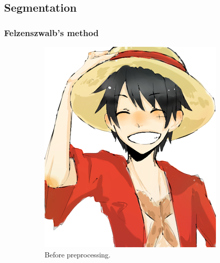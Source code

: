 \subsection{Segmentation}
\subsubsection{Felzenszwalb's method}
\begin{figure}[htb!]
\centering
\begin{subfigure}{.3\textwidth}
\includegraphics[width=\textwidth]{images/rufy_d.png}
\caption{Before preprocessing.}
\end{subfigure}
\begin{subfigure}{.3\textwidth}

\end{subfigure}
\end{figure}
